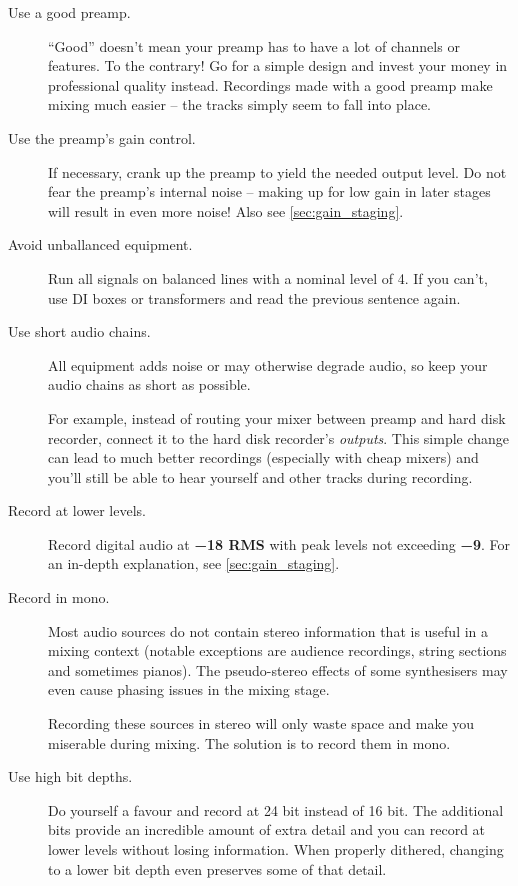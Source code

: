 \begin{description}

\item[Use a good preamp.]  ``Good'' doesn't mean your preamp has to
  have a lot of channels or features.  To the contrary!  Go for a
  simple design and invest your money in professional quality instead.
  Recordings made with a good preamp make mixing much easier -- the
  tracks simply seem to fall into place.

\item[ Use the preamp's gain control.]  If necessary, crank up the
  preamp to yield the needed output level.  Do not fear the preamp's
  internal noise -- making up for low gain in later stages will result
  in even more noise!  Also see \ref{sec:gain_staging}.

\item[Avoid unballanced equipment.]  Run all signals on balanced lines
  with a nominal level of \SI[addsign=all]{+4}{\dBu}.  If you can't,
  use DI boxes or transformers and read the previous sentence again.

\item[Use short audio chains.]  All equipment adds noise or may
  otherwise degrade audio, so keep your audio chains as short as
  possible.

  For example, instead of routing your mixer between preamp and hard
  disk recorder, connect it to the hard disk recorder's
  \emph{outputs}.  This simple change can lead to much better
  recordings (especially with cheap mixers) and you'll still be able
  to hear yourself and other tracks during recording.

\item[Record at lower levels.]  Record digital audio at
  \textbf{\SI{-18}{\dBFS} RMS} with peak levels not exceeding
  \textbf{\SI{-9}{\dBFS}}.  For an in-depth explanation, see
  \ref{sec:gain_staging}.

\item[Record in mono.]  Most audio sources do not contain stereo
  information that is useful in a mixing context (notable exceptions
  are audience recordings, string sections and sometimes pianos).  The
  pseudo-stereo effects of some synthesisers may even cause phasing
  issues in the mixing stage.

  Recording these sources in stereo will only waste space and make you
  miserable during mixing.  The solution is to record them in mono.

\item[Use high bit depths.]  Do yourself a favour and record at 24 bit
  instead of 16 bit.  The additional bits provide an incredible amount
  of extra detail and you can record at lower levels without losing
  information.  When properly dithered, changing to a lower bit depth
  even preserves some of that detail.


\end{description}
